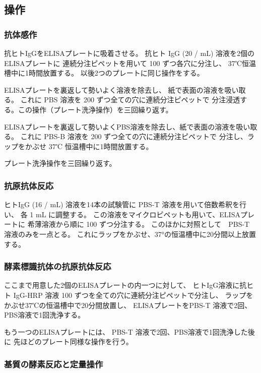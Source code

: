 \documentclass[a4paper]{ltjsarticle}
\begin{document}
\subsection{操作}

\subsubsection{抗体感作}

抗ヒトIgGをELISAプレートに吸着させる。
抗ヒト IgG (20 \ug / mL) 溶液を2個のELISAプレートに
連続分注ピペットを用いて 100 \uL ずつ各穴に分注し、
37℃恒温槽中に1時間放置する。
以後2つのプレートに同じ操作をする。

ELISAプレートを裏返して勢いよく溶液を除去し、
紙で表面の溶液を吸い取る。
これに PBS 溶液を 200 \uL ずつ全ての穴に連続分注ピペットで
分注浸透する。この操作（プレート洗浄操作）を三回繰り返す。

ELISAプレートを裏返して勢いよくPBS溶液を除去し、紙で表面の溶液を吸い取る。
これに PBS-B 溶液を 200 \uL ずつ全ての穴に連続分注ピペットで
分注し、ラップをかぶせ 37℃ 恒温槽中に1時間放置する。

プレート洗浄操作を三回繰り返す。

\subsubsection{抗原抗体反応}

ヒトIgG (16 \ug / mL) 溶液を14本の試験管に
PBS-T 溶液を用いて倍数希釈を行い、
各 1 mL に調整する。
この溶液をマイクロピペットも用いて、ELISAプレートに
希薄溶液から順に 100 \uL ずつ分注する。
このほかに対照として　PBS-T 溶液のみを一点とる。
これにラップをかぶせ、37°の恒温槽中に20分間以上放置する。

\subsubsection{酵素標識抗体の抗原抗体反応}

ここまで用意した2個のELISAプレートの内一つに対して、
ヒトIgG溶液に抗ヒト IgG-HRP 溶液 100 \uL
ずつを全ての穴に連続分注ピペットで分注し、
ラップをかぶせ37℃の恒温槽中で20分間放置し、
ELISAプレートをPBS-T 溶液で2回、PBS溶液で1回洗浄する。

もう一つのELISAプレートには、
PBS-T 溶液で2回、PBS溶液で1回洗浄した後に
先ほどのプレート同様な操作を行う。

\subsubsection{基質の酵素反応と定量操作}
\end{document}
